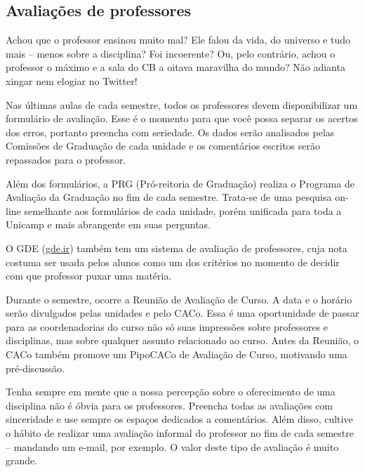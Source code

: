 \subsection{Avaliações de professores}

Achou que o professor ensinou muito mal? Ele falou da vida, do universo e tudo
mais -- menos sobre a disciplina? Foi incoerente? Ou, pelo contrário, achou o
professor o máximo e a sala do CB a oitava maravilha do mundo? Não adianta
xingar nem elogiar no Twitter!

Nas últimas aulas de cada semestre, todos os professores devem disponibilizar um
formulário de avaliação. Esse é o momento para que você possa separar os acertos
dos erros, portanto preencha com seriedade. Os dados serão analisados pelas
Comissões de Graduação de cada unidade e os comentários escritos serão
repassados para o professor.

Além dos formulários, a PRG (Pró-reitoria de Graduação) realiza o Programa de
Avaliação da Graduação no fim de cada semestre. Trata-se de uma pesquisa on-line
semelhante aos formulários de cada unidade, porém unificada para toda a Unicamp
e mais abrangente em suas perguntas.

O GDE (\url{gde.ir}) também tem um sistema de avaliação de professores, cuja
nota costuma ser usada pelos alunos como um dos critérios no momento de decidir
com que professor puxar uma matéria.

Durante o semestre, ocorre a Reunião de Avaliação de Curso. A data e o horário
serão divulgados pelas unidades e pelo CACo. Essa é uma oportunidade de passar
para as coordenadorias do curso não só suas impressões sobre professores e
disciplinas, mas sobre qualquer assunto relacionado ao curso. Antes da Reunião,
o CACo também promove um PipoCACo de Avaliação de Curso, motivando uma
pré-discussão.

Tenha sempre em mente que a nossa percepção sobre o oferecimento de uma
disciplina não é óbvia para os professores. Preencha todas as avaliações com
sinceridade e use sempre os espaços dedicados a comentários. Além disso, cultive
o hábito de realizar uma avaliação informal do professor no fim de cada semestre
-- mandando um e-mail, por exemplo. O valor deste tipo de avaliação é muito
grande.
